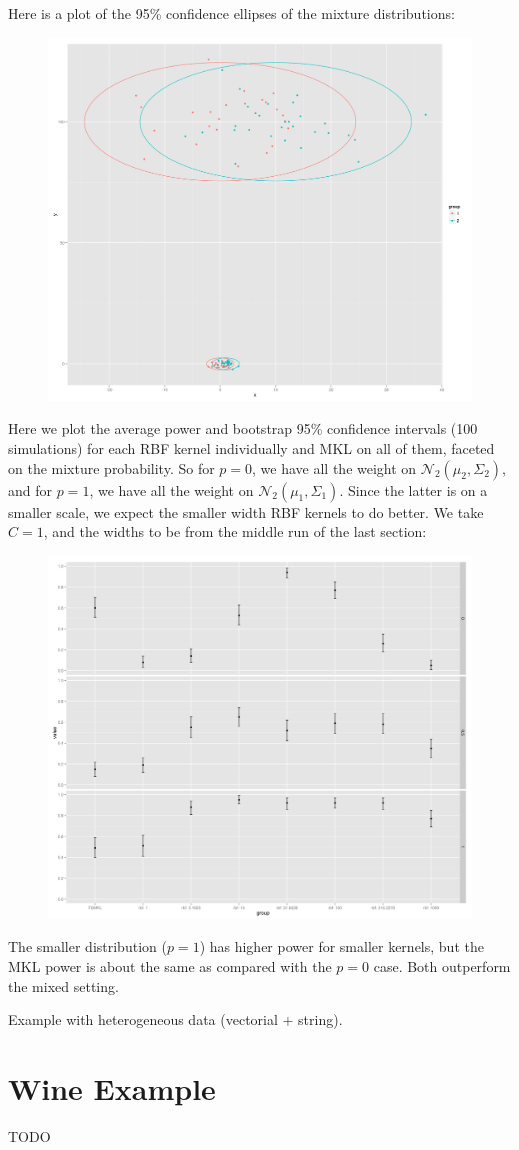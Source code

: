 Here is a plot of the 95\% confidence ellipses of the mixture distributions:
\begin{figure}[!ht]
  \centering
  \includegraphics[scale=.3]{p5.png}  
\end{figure}

Here we plot the average power and bootstrap 95\% confidence intervals
(100 simulations) for each RBF kernel individually and MKL on all of
them, faceted on the mixture probability.  So for $p = 0$, we have all
the weight on $\mathcal{N}_2(\mu_2, \Sigma_2)$, and for $p = 1$, we
have all the weight on $\mathcal{N}_2(\mu_1, \Sigma_1)$.  Since the
latter is on a smaller scale, we expect the smaller width RBF kernels
to do better.  We take $C = 1$, and the widths to be from the middle
run of the last section:
\begin{figure}[!ht]
  \centering
  \includegraphics[scale=.3]{p4-2.png}
\end{figure}
The smaller distribution ($p=1$) has higher power for smaller kernels,
but the MKL power is about the same as compared with the $p=0$ case.
Both outperform the mixed setting.




Example with heterogeneous data (vectorial + string).

\section{Wine Example}
TODO
